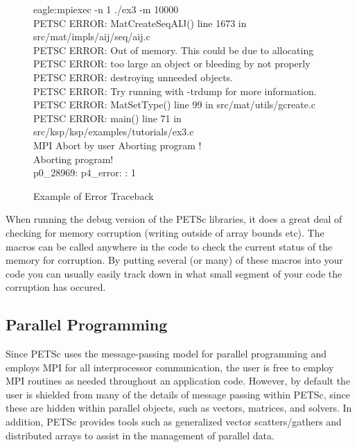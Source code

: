 \begin{figure}[H]
\begin{tabbing}
   eagle:mpiexec -n 1 ./ex3 -m 10000\\
   PETSC ERROR: MatCreateSeqAIJ() line 1673 in src/mat/impls/aij/seq/aij.c\\
   PETSC ERROR:   Out of memory. This could be due to allocating\\
   PETSC ERROR:   too large an object or bleeding by not properly\\
   PETSC ERROR:   destroying unneeded objects.\\
   PETSC ERROR:   Try running with -trdump for more information.\\
   PETSC ERROR: MatSetType() line 99 in src/mat/utils/gcreate.c  \\
   PETSC ERROR: main() line 71 in src/ksp/ksp/examples/tutorials/ex3.c\\
   MPI Abort by user Aborting program !\\
   Aborting program! \\
   p0\_28969:  p4\_error: : 1
\end{tabbing}
\nobreak
\caption{Example of Error Traceback}
\label{fig_traceback}
\end{figure}

When running the debug version of the PETSc libraries, it
does a great deal of checking for memory corruption (writing outside of
array bounds etc). The macros  can be called
anywhere in the code to check the current status of the memory for corruption.
By putting several (or many) of these macros into your code you can usually
easily track down in what small segment of your code the corruption has occured.

\subsection*{Parallel Programming}

Since PETSc uses the message-passing model for
parallel programming and employs MPI for all interprocessor
communication, the user is free to employ MPI routines as needed
throughout an application code.  However, by default the user is
shielded from many of the details of message passing within PETSc,
since these are hidden within parallel objects, such as vectors,
matrices, and solvers.  In addition, PETSc provides tools such as
generalized vector scatters/gathers and distributed arrays to assist
in the management of parallel data.

